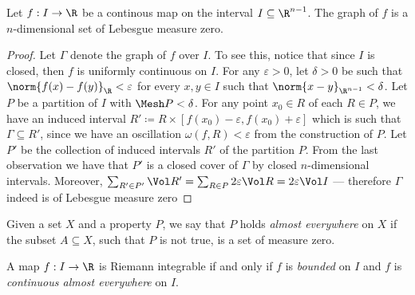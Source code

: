 \begin{example}
\label{exp:graph-lebesgue-measure-zero}
Let \(f: I \to \R\) be a continous map on the interval \(I \subseteq
\R^{n-1}\). The graph of \(f\) is a \(n\)-dimensional set of Lebesgue measure
zero.

\begin{proof}
Let \(\Gamma\) denote the graph of \(f\) over \(I\). To see this, notice that
since \(I\) is closed, then \(f\) is uniformly continuous on \(I\). For any
\(\varepsilon > 0\), let \(\delta > 0\) be such that \(\norm{f(x) - f(y)}_{\R} <
\varepsilon\) for every \(x, y \in I\) such that \(\norm{x - y}_{\R^{n-1}} <
\delta\). Let \(P\) be a partition of \(I\) with \(\Mesh P < \delta\). For any
point \(x_0 \in R\) of each \(R \in P\), we have an induced interval \(R'
\coloneq R \times [f(x_0) - \varepsilon, f(x_0) + \varepsilon]\) which is such
that \(\Gamma \subseteq R'\), since we have an oscillation \(\omega(f, R) <
\varepsilon\) from the construction of \(P\). Let \(P'\) be the collection of
induced intervals \(R'\) of the partition \(P\). From the last observation we
have that \(P'\) is a closed cover of \(\Gamma\) by closed \(n\)-dimensional
intervals. Moreover, \(\sum_{R' \in P'} \Vol R' = \sum_{R \in P} 2 \varepsilon
\Vol R = 2 \varepsilon \Vol I\) --- therefore \(\Gamma\) indeed is of Lebesgue
measure zero
\end{proof}
\end{example}

\begin{notation}
Given a set \(X\) and a property \(P\), we say that \(P\) holds \emph{almost
everywhere} on \(X\) if the subset \(A \subseteq X\), such that \(P\) is not
true, is a set of measure zero.
\end{notation}

\begin{theorem}
\label{thm:lebesgue-criterion-integrable}
A map \(f: I \to \R\) is Riemann integrable if and only if \(f\) is
\emph{bounded} on \(I\) and \(f\) is \emph{continuous almost everywhere} on
\(I\).
\end{theorem}

